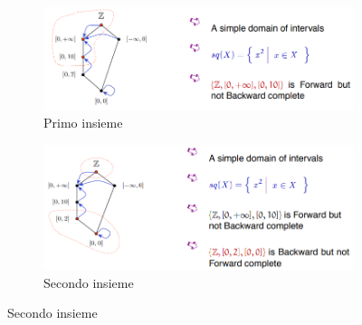 \documentclass[a4paper,oneside,titlepage]{book}
\begin{document}
\begin{figure}[htp]
	\begin{subfigure}{0.49\textwidth}
	    \centering
		\includegraphics[width=\textwidth, height=\textheight, keepaspectratio]{intervals1.png}
		\caption{Primo insieme}
	\end{subfigure}
	\hfill
	\begin{subfigure}{0.49\textwidth}
	    \centering
		\includegraphics[width=\textwidth, height=\textheight, keepaspectratio]{intervals2.png} 
		\caption{Secondo insieme}
	\end{subfigure}
\end{figure}
\end{document}
